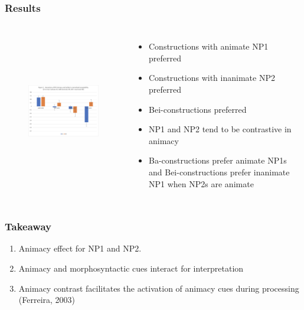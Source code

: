 \documentclass{beamer}
\begin{document}



\begin{frame}
\frametitle{Results}
\begin{columns}[c] %

\begin{figure}
\includegraphics[width=8cm,height=7cm,keepaspectratio]{SHF_Presentation/Exp1.png}
\end{figure}


{\scriptsize
\begin{itemize}
    \item<1-> Constructions with animate NP1 preferred
    \item<2-> Constructions with inanimate NP2 preferred 
    \item<3-> Bei-constructions preferred
    \item<4-> NP1 and NP2 tend to be contrastive in animacy 
    \item<5-> Ba-constructions prefer animate NP1s and Bei-constructions prefer inanimate NP1 when NP2s are animate
\end{itemize}
}
\end{columns}
\end{frame}


\begin{frame}
\frametitle{Takeaway}

\begin{enumerate}
    \pause
    \item Animacy effect for NP1 and NP2.
    \pause
   \setlength{\parskip}{1em}
   \pause
   \item Animacy and morphosyntactic cues interact for interpretation 
   \pause
   \item Animacy contrast facilitates the activation of animacy cues during processing (Ferreira, 2003) 
\end{enumerate}
\end{frame}
\end{document}
